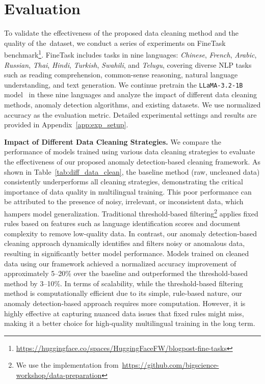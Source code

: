 \section{Evaluation}
\label{sec:eval}
To validate the effectiveness of the proposed data cleaning method and the quality of the~\dcad dataset, we conduct a series of experiments on FineTask benchmark\footnote{\url{https://huggingface.co/spaces/HuggingFaceFW/blogpost-fine-tasks}}.
FineTask includes tasks in nine languages: \textit{Chinese}, \textit{French}, \textit{Arabic}, \textit{Russian}, \textit{Thai}, \textit{Hindi}, \textit{Turkish}, \textit{Swahili}, and \textit{Telugu}, covering diverse NLP tasks such as reading comprehension, common-sense reasoning, natural language understanding, and text generation.
We continue pretrain the \texttt{LLaMA-3.2-1B} model~\cite{dubey2024llama} in these nine languages and analyze the impact of different data cleaning methods, anomaly detection algorithms, and existing datasets.
We use normalized accuracy as the evaluation metric.
Detailed experimental settings and results are provided in Appendix~\ref{app:exp_setup}.



\noindent\textbf{Impact of Different Data Cleaning Strategies.}
We compare the performance of models trained using various data cleaning strategies to evaluate the effectiveness of our proposed anomaly detection-based cleaning framework.
As shown in Table~\ref{tab:diff_data_clean}, the baseline method (raw, uncleaned data) consistently underperforms all cleaning strategies, demonstrating the critical importance of data quality in multilingual training.
This poor performance can be attributed to the presence of noisy, irrelevant, or inconsistent data, which hampers model generalization. 
Traditional threshold-based filtering\footnote{We use the implementation from~\url{https://github.com/bigscience-workshop/data-preparation}} applies fixed rules based on features such as language identification scores and document complexity to remove low-quality data.
In contrast, our anomaly detection-based cleaning approach dynamically identifies and filters noisy or anomalous data, resulting in significantly better model performance.
Models trained on cleaned data using our framework achieved a normalized accuracy improvement of approximately 5–20\% over the baseline and outperformed the threshold-based method by 3–10\%.
In terms of scalability, while the threshold-based filtering method is computationally efficient due to its simple, rule-based nature, our anomaly detection-based approach requires more computation. However, it is highly effective at capturing nuanced data issues that fixed rules might miss, making it a better choice for high-quality multilingual training in the long term.

